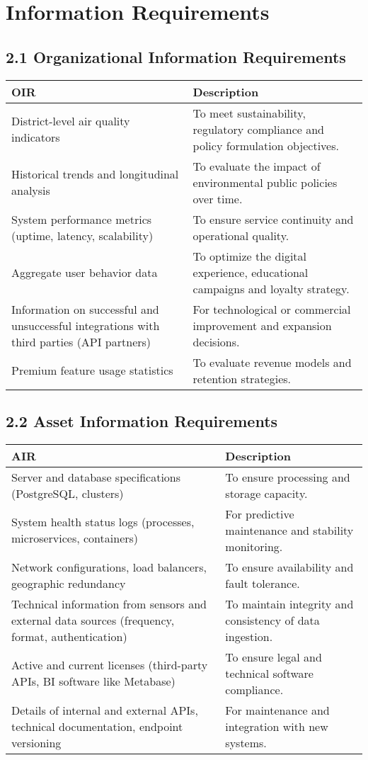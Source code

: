 \section{Information Requirements}
\subsection*{2.1 Organizational Information Requirements}

\begin{tabular}{|p{6cm}|p{9cm}|}
\hline
\textbf{OIR} & \textbf{Description} \\
\hline
District-level air quality indicators & To meet sustainability, regulatory compliance and policy formulation objectives. \\
\hline
Historical trends and longitudinal analysis & To evaluate the impact of environmental public policies over time. \\
\hline
System performance metrics (uptime, latency, scalability) & To ensure service continuity and operational quality. \\
\hline
Aggregate user behavior data & To optimize the digital experience, educational campaigns and loyalty strategy. \\
\hline
Information on successful and unsuccessful integrations with third parties (API partners) & For technological or commercial improvement and expansion decisions. \\
\hline
Premium feature usage statistics & To evaluate revenue models and retention strategies. \\
\hline
\end{tabular}

\vspace{1.5cm}
\subsection*{2.2 Asset Information Requirements}

\begin{tabular}{|p{6cm}|p{9cm}|}
\hline
\textbf{AIR} & \textbf{Description} \\
\hline
Server and database specifications (PostgreSQL, clusters) & To ensure processing and storage capacity. \\
\hline
System health status logs (processes, microservices, containers) & For predictive maintenance and stability monitoring. \\
\hline
Network configurations, load balancers, geographic redundancy & To ensure availability and fault tolerance. \\
\hline
Technical information from sensors and external data sources (frequency, format, authentication) & To maintain integrity and consistency of data ingestion. \\
\hline
Active and current licenses (third-party APIs, BI software like Metabase) & To ensure legal and technical software compliance. \\
\hline
Details of internal and external APIs, technical documentation, endpoint versioning & For maintenance and integration with new systems. \\
\hline
\end{tabular}

